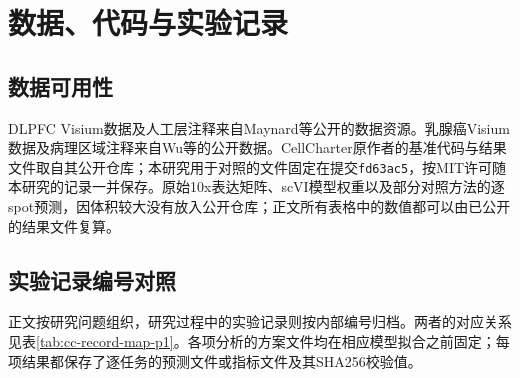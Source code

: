 \section{数据、代码与实验记录}
\label{sec:cc-records-p1}

\subsection{数据可用性}
DLPFC Visium数据及人工层注释来自Maynard等公开的数据资源\cite{maynard2021}。乳腺癌Visium数据及病理区域注释来自Wu等的公开数据\cite{wu2021,wu2021zenodo}。CellCharter原作者的基准代码与结果文件取自其公开仓库\cite{cellcharteranalyses2024}；本研究用于对照的文件固定在提交\texttt{fd63ac5}，按MIT许可随本研究的记录一并保存。原始10x表达矩阵、scVI模型权重以及部分对照方法的逐spot预测，因体积较大没有放入公开仓库；正文所有表格中的数值都可以由已公开的结果文件复算。

\subsection{实验记录编号对照}
正文按研究问题组织，研究过程中的实验记录则按内部编号归档。两者的对应关系见表\ref{tab:cc-record-map-p1}。各项分析的方案文件均在相应模型拟合之前固定；每项结果都保存了逐任务的预测文件或指标文件及其SHA256校验值。


